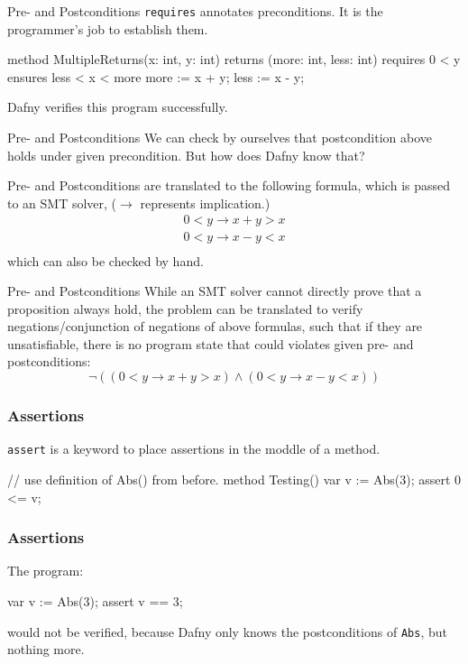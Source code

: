 \documentclass[10pt, compress]{beamer}
\begin{document}
\begin{frame}[fragile]{Pre- and Postconditions}
  \verb|requires| annotates preconditions. It is the programmer's job to establish them.
  \begin{verbnobox}[\footnotesize]
method MultipleReturns(x: int, y: int)
returns (more: int, less: int)
   requires 0 < y
   ensures less < x < more
{
   more := x + y;
   less := x - y;
}

  \end{verbnobox}
  Dafny verifies this program successfully.

\end{frame}

\begin{frame}[fragile]{Pre- and Postconditions}
  We can check by ourselves that postcondition above holds under given precondition. But how does Dafny know that?

  Pre- and Postconditions are translated to the following formula, which is passed to an SMT solver,  ($\to$ represents implication.)
  \begin{align*}
    0 < y \to x + y > x \\
    0 < y \to x - y < x \\
  \end{align*}
  which can also be checked by hand. 
\end{frame}

\begin{frame}[fragile]{Pre- and Postconditions}
  While an SMT solver cannot directly prove that a proposition always hold, the problem can be translated to verify negations/conjunction of negations of above formulas, such that if they are unsatisfiable, there is no program state that could violates given pre- and postconditions:
    $$\neg((0 < y \to x + y > x) \land (0 < y \to x - y < x))$$
\end{frame}

\begin{frame}[fragile]
  \frametitle{Assertions}
  \verb|assert| is a keyword to place assertions in the moddle of a method.
  \begin{verbnobox}[\footnotesize]
// use definition of Abs() from before.
method Testing()
{
   var v := Abs(3);
   assert 0 <= v;
}
  \end{verbnobox}
\end{frame}

\begin{frame}[fragile]
  \frametitle{Assertions}

  The program:
  \begin{verbnobox}[\footnotesize]
var v := Abs(3);
assert v == 3;
  \end{verbnobox}
  would not be verified, because Dafny only knows the postconditions of \verb|Abs|, but nothing more.
\end{frame}
\end{document}
